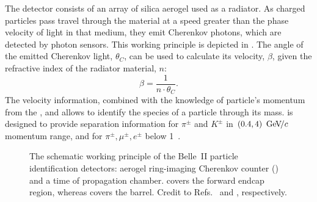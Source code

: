 The \ARICH detector \cite{Yusa:2014tua} consists of an array of silica aerogel used as a radiator.
As charged particles pass travel through the material at a speed greater than the phase velocity of light in that medium, 
they emit Cherenkov photons, which are detected by photon sensors.
This working principle is depicted in .
The angle of the emitted Cherenkov light, $\theta_C$, can be used to calculate its velocity, $\beta$, 
given the refractive index of the radiator material, $n$:
\begin{equation}
    \beta = \frac{1}{n\cdot\theta_C}.
\end{equation}
The velocity information, combined with the knowledge of particle's momentum from the \CDC, \SVD and \PXD allows to identify the species of a particle through its mass.
\ARICH is designed to provide separation information for $\pi^{\pm}$ and $K^{\pm}$ in $(0.4,4)~{\mathrm{\,Ge\kern -0.1em V\!/}c}$ momentum range, and for $\pi^{\pm},\mu^{\pm},e^{\pm}$ below 1~\gevc.

\begin{figure}[htbp!]
    \centering
    \caption{\label{fig:pid}
    The schematic working principle of the Belle~II particle identification detectors: aerogel ring-imaging Cherenkov counter () and a time of propagation chamber.
    \ARICH covers the forward endcap region, whereas \TOP covers the barrel.
    Credit to Refs.~\cite{Yusa:2014tua} and \cite{Fast:2017pff}, respectively.
    }
\end{figure}

